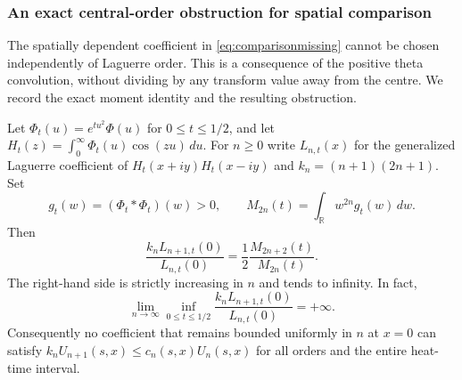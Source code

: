 \subsubsection{An exact central-order obstruction for spatial comparison}
\label{sec:centralmomentratio}
The spatially dependent coefficient in
\eqref{eq:comparisonmissing} cannot be chosen
independently of Laguerre order. This is a
consequence of the positive theta convolution,
without dividing by any transform value away
from the centre. We record the exact
moment identity and the resulting obstruction.

\begin{theorem}
\label{thm:centralmomentratio}
Let $\Phi_t(u)=e^{tu^2}\Phi(u)$ for
$0\le t\le1/2$, and let
$H_t(z)=\int_0^\infty\Phi_t(u)\cos(zu)\,du$.
For $n\ge0$ write $L_{n,t}(x)$ for the
generalized Laguerre coefficient of
$H_t(x+iy)H_t(x-iy)$ and
$k_n=(n+1)(2n+1)$. Set
\[
g_t(w)=(\Phi_t*\Phi_t)(w)>0,\qquad
M_{2n}(t)=\int_{\mathbb R}w^{2n}g_t(w)\,dw.
\]
Then
\begin{equation}\label{eq:centralratio}
\boxed{\quad
\frac{k_nL_{n+1,t}(0)}{L_{n,t}(0)}
=\frac12\frac{M_{2n+2}(t)}{M_{2n}(t)}.
\quad}
\end{equation}
The right-hand side is strictly increasing
in $n$ and tends to infinity. In fact,
\begin{equation}\label{eq:centraluniform}
\boxed{\quad
\lim_{n\to\infty}\inf_{0\le t\le1/2}
\frac{k_nL_{n+1,t}(0)}{L_{n,t}(0)}
=+\infty.
\quad}
\end{equation}
Consequently no coefficient that remains
bounded uniformly in $n$ at $x=0$
can satisfy
$k_nU_{n+1}(s,x)\le c_n(s,x)U_n(s,x)$
for all orders and the entire heat-time
interval.
\end{theorem}

